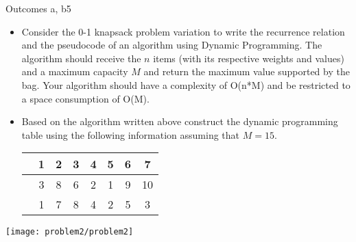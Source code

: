 \begin{problem}{Outcomes a, b}{5}

\begin{itemize}
        \item Consider the 0-1 knapsack problem variation to write the recurrence relation and the pseudocode of an algorithm using Dynamic Programming. The algorithm should receive the $n$ items (with its respective weights and values) and a maximum capacity $M$ and return the maximum value supported by the bag. Your algorithm should have a complexity of O(n*M) and be restricted to a space consumption of O(M).
        
        \item Based on the algorithm written above construct the dynamic programming table using the following information assuming that $M=15$. 
        
        \begin{center}
            \begin{tabular}{S|SSSSSSS} \toprule
                          & 1 & 2 & 3 & 4 & 5 & 6 & 7  \\ \midrule
                   & 3 & 8 & 6 & 2 & 1 & 9 & 10 \\
                    & 1 & 7 & 8 & 4 & 2 & 5 & 3  \\ \bottomrule
            \end{tabular}
        \end{center}
    \end{itemize}
\begin{center}
    \texttt{[image: problem2/problem2]}%
\end{center}

\end{problem}

